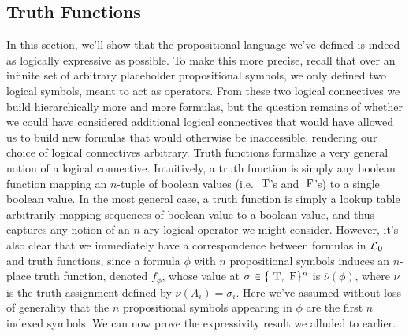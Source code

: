 \documentclass{article}
\begin{document}
\subsection{Truth Functions}
In this section, we'll show that the propositional language we've defined is indeed as logically expressive as possible. To make this more precise, recall that over an infinite set of arbitrary placeholder propositional symbols, we only defined two logical symbols, meant to act as operators. From these two logical connectives we build hierarchically more and more formulas, but the question remains of whether we could have considered additional logical connectives that would have allowed us to build new formulas that would otherwise be inaccessible, rendering our choice of logical connectives arbitrary.
\nn
Truth functions formalize a very general notion of a logical connective. Intuitively, a truth function is simply any boolean function mapping an $ n $-tuple of boolean values (i.e. $ \text{\normalfont\ T} $'s and $ \text{\normalfont\ F} $'s) to a single boolean value.
In the most general case, a truth function is simply a lookup table arbitrarily mapping sequences of boolean value to a boolean value, and thus captures any notion of an $ n $-ary logical operator we might consider. However, it's also clear that we immediately have a correspondence between formulas in $ \mathcal{L}_0 $ and truth functions, since a formula $ \phi $ with $ n $ propositional symbols induces an $ n $-place truth function, denoted $ f_\phi $, whose value at $ \sigma \in \{ \text{\normalfont\ T}, \text{\normalfont\ F} \}^n $ is $ \overline{\nu}(\phi) $, where $ \nu $ is the truth assignment defined by $ \nu(A_i) = \sigma_i $. Here we've assumed without loss of generality that the $ n $ propositional symbols appearing in $ \phi $ are the first $ n $ indexed symbols. We can now prove the expressivity result we alluded to earlier.
\end{document}
